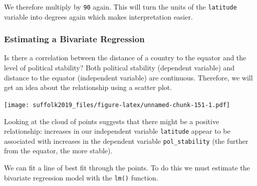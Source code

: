 \documentclass[]{article}
\newenvironment{Shaded}{\begin{snugshade}}{\end{snugshade}}
\newcommand{\DataTypeTok}[1]{\textcolor[rgb]{0.13,0.29,0.53}{#1}}
\newcommand{\DecValTok}[1]{\textcolor[rgb]{0.00,0.00,0.81}{#1}}
\newcommand{\KeywordTok}[1]{\textcolor[rgb]{0.13,0.29,0.53}{\textbf{#1}}}
\newcommand{\NormalTok}[1]{#1}
\newcommand{\OperatorTok}[1]{\textcolor[rgb]{0.81,0.36,0.00}{\textbf{#1}}}
\newcommand{\OtherTok}[1]{\textcolor[rgb]{0.56,0.35,0.01}{#1}}
\newcommand{\StringTok}[1]{\textcolor[rgb]{0.31,0.60,0.02}{#1}}
\begin{document}
We therefore multiply by \texttt{90} again. This will turn the units of the \texttt{latitude} variable into degrees again which makes interpretation easier.

\begin{Shaded}
\end{Shaded}

\hypertarget{estimating-a-bivariate-regression}{%
\subsubsection{Estimating a Bivariate Regression}\label{estimating-a-bivariate-regression}}

Is there a correlation between the distance of a country to the equator and the level of political stability? Both political stability (dependent variable) and distance to the equator (independent variable) are continuous. Therefore, we will get an idea about the relationship using a scatter plot.

\begin{Shaded}
\end{Shaded}

\texttt{[image: suffolk2019\_files/figure-latex/unnamed-chunk-151-1.pdf]}

Looking at the cloud of points suggests that there might be a positive relationship: increases in our independent variable \texttt{latitude} appear to be associated with increases in the dependent variable \texttt{pol\_stability} (the further from the equator, the more stable).

We can fit a line of best fit through the points. To do this we must estimate the bivariate regression model with the \texttt{lm()} function.
\end{document}
